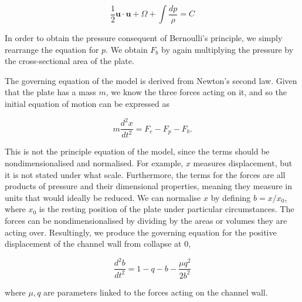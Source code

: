 \documentclass{article}
\begin{document}
\begin{equation}
    \frac{1}{2}\mathbf{u}\cdot\mathbf{u} + \Omega + \int\frac{dp}{\rho} = C
    \label{eqn:bernoulli}
\end{equation}

In order to obtain the pressure consequent of Bernoulli's principle, we simply rearrange the equation for $p$.
We obtain $F_b$ by again multiplying the pressure by the cross-sectional area of the plate.


The governing equation of the model is derived from Newton's second law.
Given that the plate has a mass $m$, we know the three forces acting on it,
and so the initial equation of motion can be expressed as

\begin{equation}
    m\frac{d^2 x}{dt^2} = F_e - F_p - F_b.
    \label{eqn:model_init}
\end{equation}

This is not the principle equation of the model,
since the terms should be nondimensionalised and normalised.
For example, $x$ measures displacement,
but it is not stated under what scale.
Furthermore, the terms for the forces are all products of pressure and their dimensional properties,
meaning they measure in units that would ideally be reduced. 
We can normalise $x$ by defining $b = x/x_0$, where $x_0$ is the resting position of the plate under particular circumstances. %
The forces can be nondimensionalised by dividing by the areas or volumes they are acting over.
Resultingly, we produce the governing equation for the positive displacement of the channel wall from collapse at $0$,

\begin{equation}
    \frac{d^2b}{dt^2} = 1 - q - b - \frac{\mu q^2}{2b^2}
    \label{eqn:master}
\end{equation}

where $\mu, q$ are parameters linked to the forces acting on the channel wall.

\end{document}
